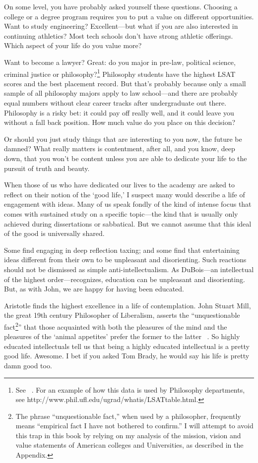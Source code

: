 On some level, you have probably asked yourself these questions. Choosing a college or a degree program requires you to put a value on different opportunities. Want to study engineering? Excellent---but what if you are also interested in continuing athletics? Most tech schools don't have strong athletic offerings. Which aspect of your life do you value more? 

Want to become a lawyer? Great: do you major in pre-law, political science, criminal justice or philosophy?\footnote{See ~\citep{LSAC:2015wz}. For an example of how this data is used by Philosophy departments, see http:\slash \slash www.phil.ufl.edu\slash ugrad\slash whatis\slash LSATtable.html.} Philosophy students have the highest LSAT scores and the best placement record. But that's probably because only a small sample of all philosophy majors apply to law school---and there are probably equal numbers without clear career tracks after undergraduate out there. Philosophy is a risky bet: it could pay off really well, and it could leave you without a fall back position. How much value do you place on this decision?

Or should you just study things that are interesting to you now, the future be damned? What really matters is contentment, after all, and you know, deep down, that you won't be content unless you are able to dedicate your life to the pursuit of truth and beauty. 

When those of us who have dedicated our lives to the academy are asked to reflect on their notion of the `good life,' I suspect many would describe a life of engagement with ideas. Many of us speak fondly of the kind of intense focus that comes with sustained study on a specific topic---the kind that is usually only achieved during dissertations or sabbatical. But we cannot assume that this ideal of the good is universally shared.

Some find engaging in deep reflection taxing; and some find that entertaining ideas different from their own to be unpleasant and disorienting. Such reactions should not be dismissed as simple anti-intellectualism. As DuBois---an intellectual of the highest order---recognizes, education can be unpleasant and disorienting. But, as with John, we are happy for having been educated.

Aristotle finds the highest excellence in a life of contemplation. John Stuart Mill, the great 19th century Philosopher of Liberalism, asserts the ``unquestionable fact\footnote{The phrase ``unquestionable fact,'' when used by a philosopher, frequently means ``empirical fact I have not bothered to confirm.'' I will attempt to avoid this trap in this book by relying on my analysis of the mission, vision and value statements of American colleges and Universities, as described in the Appendix.}'' that those acquainted with both the pleasures of the mind and the pleasures of the `animal appetites' prefer the former to the latter ~\citep[p. 9]{Mill:1871vt}. So highly educated intellectuals tell us that being a highly educated intellectual is a pretty good life. Awesome. I bet if you asked Tom Brady, he would say his life is pretty damn good too.

